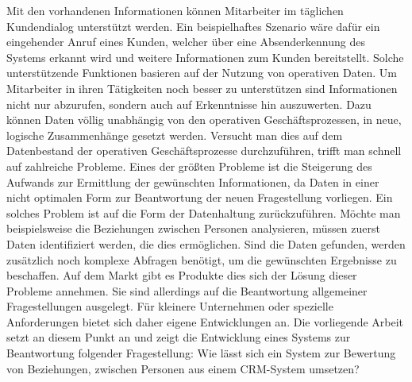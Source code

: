 Mit den vorhandenen Informationen können Mitarbeiter im täglichen Kundendialog unterstützt werden. Ein beispielhaftes Szenario wäre dafür ein eingehender Anruf eines Kunden, welcher über eine Absenderkennung des Systems erkannt wird und weitere Informationen zum Kunden bereitstellt. Solche unterstützende Funktionen basieren auf der Nutzung von operativen Daten. Um Mitarbeiter in ihren Tätigkeiten noch besser zu unterstützen sind Informationen nicht nur abzurufen, sondern auch auf Erkenntnisse hin auszuwerten. Dazu können Daten völlig unabhängig von den operativen Geschäftsprozessen, in neue, logische Zusammenhänge gesetzt werden. Versucht man dies auf dem Datenbestand der operativen Geschäftsprozesse durchzuführen, trifft man schnell auf zahlreiche Probleme. Eines der größten Probleme ist die Steigerung des Aufwands zur Ermittlung der gewünschten Informationen, da Daten in einer nicht optimalen Form zur Beantwortung der neuen Fragestellung vorliegen. Ein solches Problem ist auf die Form der Datenhaltung zurückzuführen. Möchte man beispielsweise die Beziehungen zwischen Personen analysieren, müssen zuerst Daten identifiziert werden, die dies ermöglichen. Sind die Daten gefunden, werden zusätzlich noch komplexe Abfragen benötigt, um die gewünschten Ergebnisse zu beschaffen. Auf dem Markt gibt es Produkte dies sich der Lösung dieser Probleme annehmen. Sie sind allerdings auf die Beantwortung allgemeiner Fragestellungen ausgelegt. Für kleinere Unternehmen oder spezielle Anforderungen bietet sich daher eigene Entwicklungen an. Die vorliegende Arbeit setzt an diesem Punkt an und zeigt die Entwicklung eines Systems zur Beantwortung folgender Fragestellung: Wie lässt sich ein System zur Bewertung von Beziehungen, zwischen Personen aus einem CRM-System umsetzen?






